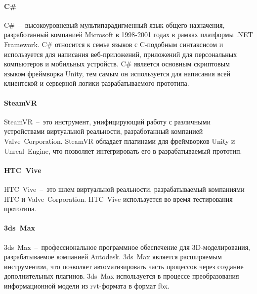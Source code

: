 \paragraph{C\#}
C\#~--~высокоуровневый мультипарадигменный язык общего назначения,
разработанный компанией Microsoft в 1998-2001 годах
в рамках платформы .NET Framework.
C\# относится к семье языков с C-подобным синтаксисом и
используется для написания веб-приложений,
приложений для персональных компьютеров и мобильных устройств.
\cite{DocCSharp}
C\# является основным скриптовым языком фреймворка Unity,
тем самым он используется для написания всей
клиентской и серверной логики разрабатываемого прототипа.

\paragraph{SteamVR}
SteamVR~--~это инструмент, унифицирующий работу с различными
устройствами виртуальной реальности,
разработанный компанией Valve~Corporation.%
\cite{SteamVR}
SteamVR обладает плагинами для фреймворков Unity и Unreal~Engine,
что позволяет интегрировать его в разрабатываемый прототип. 

\paragraph{HTC~Vive}

HTC~Vive~--~это шлем виртуальной реальности,
разрабатываемый компаниями HTC и Valve~Corporation.%
\cite{HTCVive}
HTC~Vive используется во время тестирования прототипа.

\paragraph{3ds~Max}

3ds~Max~--~профессиональное программное обеспечение для 3D-моделирования,
разрабатываемое компанией Autodesk.
3ds~Max является расширяемым инструментом,
что позволяет автоматизировать часть процессов
через создание дополнительных плагинов.%
\cite{Doc3DSMAX}
3ds~Max используется в процессе преобразования информационной модели
из rvt-формата в формат fbx.
